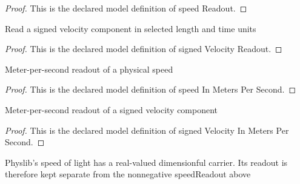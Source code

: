 \begin{proof}
  This is the declared model definition of speed Readout.
\end{proof}
\begin{definition}
  \label{def:physics:phyx-mini-0511:phyxminiproblems-problemphyxmini0511-signedvelocityreadout}
  Read a signed velocity component in selected length and time units
\end{definition}
\begin{proof}
  This is the declared model definition of signed Velocity Readout.
\end{proof}
\begin{definition}
  \label{def:physics:phyx-mini-0511:phyxminiproblems-problemphyxmini0511-speedinmeterspersecond}
  Meter-per-second readout of a physical speed
\end{definition}
\begin{proof}
  This is the declared model definition of speed In Meters Per Second.
\end{proof}
\begin{definition}
  \label{def:physics:phyx-mini-0511:phyxminiproblems-problemphyxmini0511-signedvelocityinmeterspersecond}
  Meter-per-second readout of a signed velocity component
\end{definition}
\begin{proof}
  This is the declared model definition of signed Velocity In Meters Per Second.
\end{proof}
\begin{definition}
  \label{def:physics:phyx-mini-0511:phyxminiproblems-problemphyxmini0511-vacuumlightspeedreadout}
  Physlib's speed of light has a real-valued dimensionful carrier. Its readout is therefore kept separate from the nonnegative speedReadout above
\end{definition}
